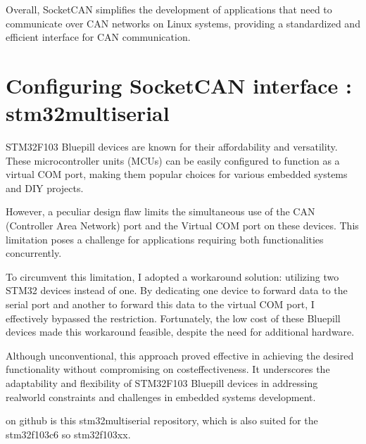 \documentclass[letterpaper,10pt,english]{sphinxmanual}
\begin{document}
\sphinxAtStartPar
Overall, SocketCAN simplifies the development of applications that need to communicate over CAN networks on Linux systems, providing a standardized and efficient interface for CAN communication.


\section{Configuring SocketCAN interface : stm32multiserial}
\label{\detokenize{socketcan:configuring-socketcan-interface-stm32multiserial}}
\sphinxAtStartPar
STM32F103 Bluepill devices are known for their affordability and versatility. These microcontroller units (MCUs) can be easily configured to function as a virtual COM port, making them popular choices for various embedded systems and DIY projects.

\sphinxAtStartPar
However, a peculiar design flaw limits the simultaneous use of the CAN (Controller Area Network) port and the Virtual COM port on these devices. This limitation poses a challenge for applications requiring both functionalities concurrently.

\sphinxAtStartPar
To circumvent this limitation, I adopted a workaround solution: utilizing two STM32 devices instead of one. By dedicating one device to forward data to the serial port and another to forward this data to the virtual COM port, I effectively bypassed the restriction. Fortunately, the low cost of these Bluepill devices made this workaround feasible, despite the need for additional hardware.

\sphinxAtStartPar
Although unconventional, this approach proved effective in achieving the desired functionality without compromising on cost\sphinxhyphen{}effectiveness. It underscores the adaptability and flexibility of STM32F103 Bluepill devices in addressing real\sphinxhyphen{}world constraints and challenges in embedded systems development.

\sphinxAtStartPar
{}

\sphinxAtStartPar
on github is this stm32multiserial repository, which is also suited for the stm32f103c6 so stm32f103xx.

\sphinxAtStartPar
{}
\end{document}
